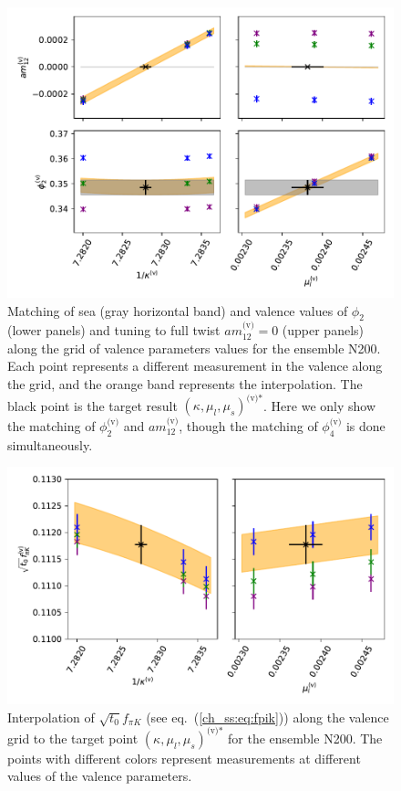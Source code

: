 \begin{figure}
    \centering
    \includegraphics[width=1.\textwidth]{./cap4/figs/matching_N200.pdf}
    \caption{Matching of sea (gray horizontal band) and valence values of $\phi_2$ (lower panels) and tuning to full twist $am_{12}^{\textrm{(v)}}=0$ (upper panels) along the grid of valence parameters values for the ensemble N200. Each point represents a different measurement in the valence along the grid, and the orange band represents the interpolation. The black point is the target result $\left(\kappa,\mu_l,\mu_s\right)^{\textrm{(v)*}}$. Here we only show the matching of $\phi_2^{\textrm{(v)}}$ and $am_{12}^{\textrm{(v)}}$, though the matching of $\phi_4^{\textrm{(v)}}$ is done simultaneously.}
    \label{ch_ma:fig:match}
\end{figure}

\begin{figure}
    \centering
    \includegraphics[width=1.\textwidth]{./cap4/figs/interp_fpik_N200.pdf}
    \caption{Interpolation of $\sqrt{t_0}f_{\pi K}$ (see eq.~(\ref{ch_ss:eq:fpik})) along the valence grid to the target point $\left(\kappa,\mu_l,\mu_s\right)^{\textrm{(v)*}}$ for the ensemble N200. The points with different colors represent measurements at different values of the valence parameters.}
    \label{ch_ma:fig:fpik_interp}
\end{figure}

